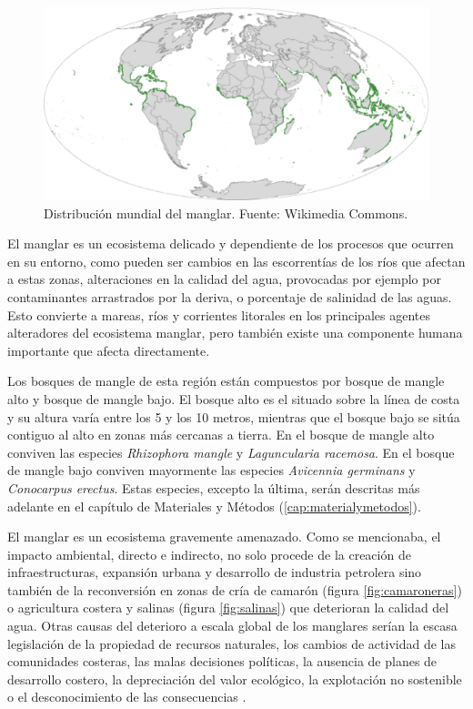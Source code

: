 \begin{figure}
	\centering
	\includegraphics[width=0.8\linewidth]{./Imagenes/distribucion_mundial_mangle.eps}
	\caption[Distribución mundial de manglar]{Distribución mundial del manglar. Fuente: Wikimedia Commons.}
	\label{fig:mundial}
\end{figure}

El manglar es un ecosistema delicado y dependiente de los procesos que ocurren en su entorno, como pueden ser cambios en las escorrentías de los ríos que afectan a estas zonas, alteraciones en la calidad del agua, provocadas por ejemplo por contaminantes arrastrados por la deriva, o porcentaje de salinidad de las aguas. Esto convierte a mareas, ríos y corrientes litorales en los principales agentes alteradores del ecosistema manglar, pero también existe una componente humana importante que afecta directamente.%

Los bosques de mangle de esta región están compuestos por bosque de mangle alto y bosque de mangle bajo. El bosque alto es el situado sobre la línea de costa y su altura varía entre los 5 y los 10 metros, mientras que el bosque bajo se sitúa contiguo al alto en zonas más cercanas a tierra. En el bosque de mangle alto conviven las especies \textit{Rhizophora mangle} y \textit{Laguncularia racemosa}. En el bosque de mangle bajo conviven mayormente las especies \textit{Avicennia germinans} y \textit{Conocarpus erectus}. Estas especies, excepto la última, serán descritas más adelante en el capítulo de Materiales y Métodos (\ref{cap:materialymetodos}).%

El manglar es un ecosistema gravemente amenazado. Como se mencionaba, el impacto ambiental, directo e indirecto, no solo procede de la creación de infraestructuras, expansión urbana y desarrollo de industria petrolera sino también de la reconversión en zonas de cría de camarón (figura \ref{fig:camaroneras}) o agricultura costera y salinas (figura \ref{fig:salinas}) que deterioran la calidad del agua. Otras causas del deterioro a escala global de los manglares serían la escasa legislación de la propiedad de recursos naturales, los cambios de actividad de las comunidades costeras, las malas decisiones políticas, la ausencia de planes de desarrollo costero, la depreciación del valor ecológico, la explotación no sostenible o el desconocimiento de las consecuencias \citep{yanez1994}.%

